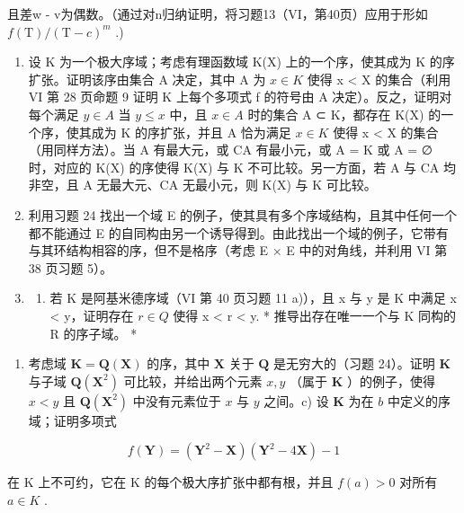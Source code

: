 且差w - v为偶数。（通过对n归纳证明，将习题13（VI，第40页）应用于形如 \(f(\mathrm{T})/(\mathrm{T}-c)^{m}\) .)

\begin{enumerate}
\def\labelenumi{\arabic{enumi})}
\setcounter{enumi}{23}
\item
  设 K 为一个极大序域；考虑有理函数域 K(X) 上的一个序，使其成为 K 的序扩张。证明该序由集合 A 决定，其中 A 为 \(x \in K\) 使得 x \textless{} X 的集合（利用 VI 第 28 页命题 9 证明 K 上每个多项式 f 的符号由 A 决定）。反之，证明对每个满足 \(y \in A\) 当 \(y \leqslant x\) 中，且 \(x \in A\) 时的集合 A ⊂ K，都存在 K(X) 的一个序，使其成为 K 的序扩张，并且 A 恰为满足 \(x \in K\) 使得 x \textless{} X 的集合（用同样方法）。当 A 有最大元，或 CA 有最小元，或 A = K 或 A = ∅ 时，对应的 K(X) 的序使得 K(X) 与 K 不可比较。另一方面，若 A 与 CA 均非空，且 A 无最大元、CA 无最小元，则 K(X) 与 K 可比较。
\item
  利用习题 24 找出一个域 E 的例子，使其具有多个序域结构，且其中任何一个都不能通过 E 的自同构由另一个诱导得到。由此找出一个域的例子，它带有与其环结构相容的序，但不是格序（考虑 E × E 中的对角线，并利用 VI 第 38 页习题 5）。
\item
  \begin{enumerate}
  \def\labelenumii{\alph{enumii})}
  \tightlist
  \item
    若 K 是阿基米德序域（VI 第 40 页习题 11 a)），且 x 与 y 是 K 中满足 x \textless{} y，证明存在 \(r \in Q\) 使得 x \textless{} r \textless{} y. * 推导出存在唯一一个与 K 同构的 R 的序子域。 *
  \end{enumerate}
\end{enumerate}

\begin{enumerate}
\def\labelenumi{\alph{enumi})}
\setcounter{enumi}{1}
\tightlist
\item
  考虑域 \(\mathbf{K} = \mathbf{Q}(\mathbf{X})\) 的序，其中 \(\mathbf{X}\) 关于 \(\mathbf{Q}\) 是无穷大的（习题 24）。证明 \(\mathbf{K}\) 与子域 \(\mathbf{Q}(\mathbf{X}^2)\) 可比较，并给出两个元素 \(x, y\) （属于 \(\mathbf{K}\) ）的例子，使得 \(x < y\) 且 \(\mathbf{Q}(\mathbf{X}^2)\) 中没有元素位于 \(x\) 与 \(y\) 之间。c) 设 \(\mathbf{K}\) 为在 \(b\) 中定义的序域；证明多项式
\end{enumerate}

\[
f (\mathbf {Y}) = (\mathbf {Y} ^ {2} - \mathbf {X}) (\mathbf {Y} ^ {2} - 4 \mathbf {X}) - 1
\]

在 K 上不可约，它在 K 的每个极大序扩张中都有根，并且 \(f(a) > 0\) 对所有 \(a \in K\) .

